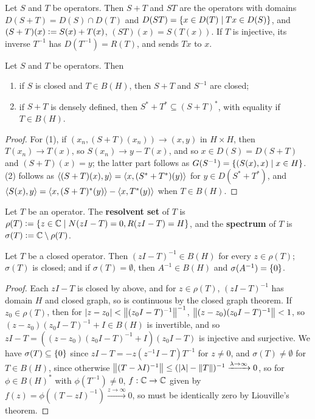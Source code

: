 \documentclass[10pt]{amsart}
\begin{document}
\begin{definition}
    Let $S$ and $T$ be operators. Then $S + T$ and $ST$ are the operators with domains $D(S + T) = D(S) \cap D(T)$ and $D(ST) = \left\{  x \in D(T) \mid Tx \in D(S)  \right\}$, and $(S + T)(x) \vcentcolon= S(x) + T(x)$, $(ST)(x) = S(T(x))$. If $T$ is injective, its inverse $T^{-1}$ has $D(T^{-1}) = R(T)$, and sends $Tx$ to $x$.
\end{definition}
\begin{lemma}
    Let $S$ and $T$ be operators. Then
    \begin{enumerate}
        \item if $S$ is closed and $T \in B(H)$, then $S + T$ and $S^{-1}$ are closed;
        \item if $S + T$ is densely defined, then $S^* + T^* \subseteq (S + T)^*$, with equality if $T \in B(H)$.
    \end{enumerate}
\end{lemma}
\begin{proof}
    For (1), if $(x_n, (S + T)(x_n)) \to (x, y)$ in $H \times H$, then $T(x_n) \to T(x)$, so $S(x_n) \to y - T(x)$, and so $x \in D(S) = D(S + T)$ and $(S + T)(x) = y$; the latter part follows as $G(S^{-1}) = \left\{  (S(x), x) \mid x \in H  \right\}$. (2) follows as $\left\langle (S + T)(x), y \right\rangle = \left\langle x, (S^* + T^*)(y) \right\rangle$ for $y \in D(S^* + T^*)$, and $\left\langle S(x), y \right\rangle = \left\langle x, (S + T)^*(y) \right\rangle - \left\langle x, T^*(y) \right\rangle$ when $T \in B(H)$.
\end{proof}
\begin{definition}
    Let $T$ be an operator. The \textbf{resolvent set} of $T$ is $\rho(T) \vcentcolon= \left\{  z \in \mathbb{C} \mid N(zI - T) = 0, R(zI - T) = H  \right\}$, and the \textbf{spectrum} of $T$ is $\sigma(T) \vcentcolon= \mathbb{C} \setminus \rho(T)$.
\end{definition}
\begin{proposition}\label{closedprops}
    Let $T$ be a closed operator. Then $(zI - T)^{-1} \in B(H)$ for every $z \in \rho(T)$; $\sigma(T)$ is closed; and if $\sigma(T) = \emptyset$, then $A^{-1} \in B(H)$ and $\sigma(A^{-1}) = \left\{  0  \right\}$.
\end{proposition}
\begin{proof}
    Each $zI - T$ is closed by above, and for $z \in \rho(T)$, $(zI - T)^{-1}$ has domain $H$ and closed graph, so is continuous by the closed graph theorem. If $z_0 \in \rho(T)$, then for $\left| z - z_0 \right| < \left\| (z_0I - T)^{-1} \right\|^{-1}$, $\left\| (z - z_0)(z_0I - T)^{-1} \right\| < 1$, so $(z - z_0)(z_0I - T)^{-1} + I \in B(H)$ is invertible, and so $zI - T = ((z - z_0)(z_0I - T)^{-1} + I)(z_0I - T)$ is injective and surjective. We have $\sigma(T) \subseteq \left\{  0  \right\}$ since $zI - T = -z(z^{-1}I - T)T^{-1}$ for $z \neq 0$, and $\sigma(T) \neq \emptyset$ for $T \in B(H)$, since otherwise $\left\| (T - \lambda I)^{-1} \right\| \leq (\left| \lambda \right| - \left\| T \right\|)^{-1} \xrightarrow{\lambda \to \infty} 0$, so for $\phi \in B(H)^*$ with $\phi(T^{-1}) \neq 0$, $f : \mathbb{C} \to \mathbb{C}$ given by $f(z) = \phi((T - z I)^{-1}) \xrightarrow{z \to \infty} 0$, so must be identically zero by Liouville's theorem. 
\end{proof}
\end{document}
